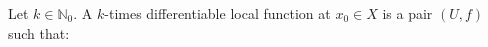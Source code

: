 Let $k \in \mathbb{N}_0$. A $k$-times differentiable local function at $x_0 \in X$ is a pair $(U, f)$ such that:
